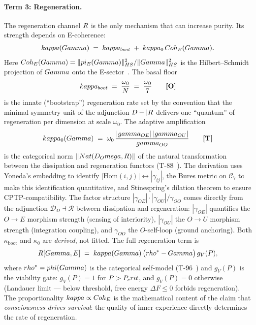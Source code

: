 \paragraph{Term 3: Regeneration.}
The regeneration channel $R$ is the only mechanism that can increase purity. Its
strength depends on E-coherence:
\begin{equation}
  kappa(Gamma) \;=\; kappa_{boot} \;+\; kappa_0\,Coh_E(Gamma).
  \label{eq:kappa}
\end{equation}
Here $Coh_E(Gamma) = \|pi_E(Gamma)\|_{HS}^2 / \|Gamma\|_{HS}^2$ is the
Hilbert--Schmidt projection of $Gamma$ onto the E-sector~. The basal floor
\begin{equation}
  kappa_{boot} \;=\; \frac{\omega_0}{N} \;=\; \frac{\omega_0}{7}\qquad\textbf{[O]}
  \label{eq:kappa-boot}
\end{equation}
is the innate (``bootstrap'') regeneration rate set by the convention that the
minimal-symmetry unit of the adjunction $D-|R$ delivers one ``quantum''
of regeneration per dimension at scale $\omega_0$. The adaptive amplification
\begin{equation}
  kappa_0(Gamma) \;=\; \omega_0\,\frac{|gamma_{OE}|\,|gamma_{OU}|}{gamma_{OO}}
  \qquad\textbf{[T]}
  \label{eq:kappa-0}
\end{equation}
is the categorical norm $\|Nat(D_Omega,R)\|$ of the natural
transformation between the dissipation and regeneration functors (T-88~).
The derivation uses Yoneda's embedding to identify $|\mathrm{Hom}(i,j)| \leftrightarrow |\gamma_{ij}|$,
the Bures metric on $\mathcal{C}_7$ to make this identification quantitative, and
Stinespring's dilation theorem to ensure CPTP-compatibility. The factor structure
$|\gamma_{OE}|\cdot|\gamma_{OU}|/\gamma_{OO}$ comes directly from the adjunction
$\mathcal{D}_\Omega \dashv \mathcal{R}$ between dissipation and regeneration: $|\gamma_{OE}|$
quantifies the $O\to E$ morphism strength (sensing of interiority), $|\gamma_{OU}|$
the $O\to U$ morphism strength (integration coupling), and $\gamma_{OO}$ the $O$-self-loop
(ground anchoring).
Both $\kappa_{\mathrm{boot}}$ and $\kappa_0$ are \emph{derived}, not fitted. The full
regeneration term is
\begin{equation}
  R[Gamma, E] \;=\; kappa(Gamma) \,\bigl(rho^* - Gamma\bigr)\, g_V(P),
  \label{eq:regen-full}
\end{equation}
where $rho^* = phi(Gamma)$ is the categorical self-model (T-96~) and $g_V(P)$
is the viability gate: $g_V(P) = 1$ for $P > P_crit$, and $g_V(P) = 0$ otherwise
(Landauer limit --- below threshold, free energy $\Delta F \leq 0$ forbids regeneration).
The proportionality $kappa \propto Coh_E$ is the mathematical content of the claim that
\emph{consciousness drives survival}: the quality of inner experience directly
determines the rate of regeneration.

